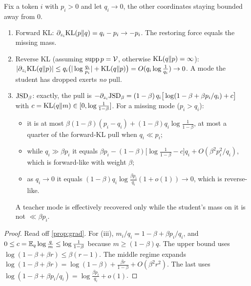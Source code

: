 \begin{proposition}\label{prop:missing}
\Pv\Ck Fix a token $i$ with $p_i>0$ and let $q_i\to0$, the other coordinates staying bounded away from $0$.
\begin{enumerate}[label=(\roman*),nosep]
\item Forward KL: $\partial_{z_i}\mathrm{KL}(p\|q)=q_i-p_i\to-p_i$. The restoring force equals the missing mass.
\item Reverse KL (assuming $\operatorname{supp}p=\mathcal{V}$, otherwise $\mathrm{KL}(q\|p)=\infty$):
$|\partial_{z_i}\mathrm{KL}(q\|p)|\le q_i\big(|\log\tfrac{q_i}{p_i}|+\mathrm{KL}(q\|p)\big)=O(q_i\log\tfrac1{q_i})\to0$. A mode the student has
dropped exerts \emph{no} pull.
\item $\mathrm{JSD}_\beta$: exactly, the pull is $-\partial_{z_i}\mathrm{JSD}_\beta=(1-\beta)\,q_i\big[\log(1-\beta+\beta p_i/q_i)+c\big]$ with
$c=\mathrm{KL}(q\|m)\in[0,\log\frac1{1-\beta}]$. For a missing mode ($p_i>q_i$):
\begin{itemize}[nosep]
\item it is at most $\beta(1-\beta)(p_i-q_i)+(1-\beta)q_i\log\frac1{1-\beta}$, at most a quarter of the forward-KL pull
when $q_i\ll p_i$;
\item while $q_i\gg\beta p_i$ it equals $\beta p_i-(1-\beta)\big[\log\frac1{1-\beta}-c\big]q_i+O(\beta^2p_i^2/q_i)$, which is
forward-like with weight $\beta$;
\item as $q_i\to0$ it equals $(1-\beta)q_i\log\frac{\beta p_i}{q_i}(1+o(1))\to0$, which is reverse-like.
\end{itemize}
A teacher mode is effectively recovered only while the student's mass on it is not $\ll\beta p_i$.
\end{enumerate}
\end{proposition}
\begin{proof}
Read off \cref{prop:grad}. For (iii), $m_i/q_i=1-\beta+\beta p_i/q_i$, and
$0\le c=\mathbb{E}_q\log\frac qm\le\log\frac1{1-\beta}$ because $m\ge(1-\beta)q$. The upper bound uses
$\log(1-\beta+\beta r)\le\beta(r-1)$. The middle regime expands
$\log(1-\beta+\beta r)=\log(1-\beta)+\frac{\beta r}{1-\beta}+O(\beta^2r^2)$. The last uses
$\log(1-\beta+\beta p_i/q_i)=\log\frac{\beta p_i}{q_i}+o(1)$.
\end{proof}

